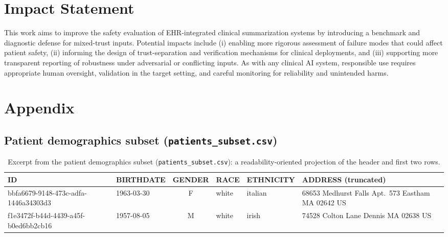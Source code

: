 \documentclass{article}
\theoremstyle{plain}
\theoremstyle{definition}
\theoremstyle{remark}
\begin{document}
\section{Impact Statement}
This work aims to improve the safety evaluation of EHR-integrated clinical summarization systems by introducing a benchmark and diagnostic defense for mixed-trust inputs. Potential impacts include (i) enabling more rigorous assessment of failure modes that could affect patient safety, (ii) informing the design of trust-separation and verification mechanisms for clinical deployments, and (iii) supporting more transparent reporting of robustness under adversarial or conflicting inputs. As with any clinical AI system, responsible use requires appropriate human oversight, validation in the target setting, and careful monitoring for reliability and unintended harms.




\clearpage
\appendix
\onecolumn
\section{Appendix}

\subsection{Patient demographics subset (\texttt{patients\_subset.csv})}
\label{app:file-patients-subset}
\begin{table}[H]
  \centering
  \footnotesize
  \setlength{\tabcolsep}{4pt}
  \begin{tabularx}{\textwidth}{l l c l l X}
    \toprule
    \textbf{ID} & \textbf{BIRTHDATE} & \textbf{GENDER} & \textbf{RACE} & \textbf{ETHNICITY} & \textbf{ADDRESS (truncated)} \\
    \midrule
    bbfa6679-9148-473c-adfa-1446a34303d3 & 1963-03-30 & F & white & italian & 68653 Medhurst Falls Apt.\ 573 Eastham MA 02642 US \\
    f1e3472f-b44d-4439-a45f-b0ed6bb2cb16 & 1957-08-05 & M & white & irish & 74528 Colton Lane Dennis MA 02638 US \\
    \bottomrule
  \end{tabularx}
  \caption{Excerpt from the patient demographics subset (\texttt{patients\_subset.csv}): a readability-oriented projection of the header and first two rows.}
  \label{tab:app-patients-subset-head}
\end{table}
\end{document}
